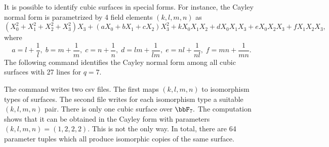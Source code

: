 \bigskip


It is possible to identify cubic surfaces in special forms. 
For instance, the Cayley normal form is parametrized by 4 field elements $(k,l,m,n)$ as
$$
\left(X_0^2+X_1^2+X_2^2+X_3^2\right)X_3 + \left(aX_0+bX_1+cX_2\right)X_3^2+kX_0X_1X_2+dX_0X_1X_3+eX_0X_2X_3+fX_1X_2X_3,
$$
where 
$$
a=l+ \frac{1}{l}, \;
b=m+ \frac{1}{m}, \;
c=n+ \frac{1}{n}, \;
d=lm+ \frac{1}{lm}, \;
e=nl+ \frac{1}{nl}, \;
f=mn+ \frac{1}{mn}.
$$
The following command identifies the Cayley normal form among all cubic surfaces with 27 lines for $q=7.$


The command writes two csv files. The first maps $(k,l,m,n)$ to isomorphism types of surfaces. 
The second file writes for each isomorphism type a suitable $(k,l,m,n)$ pair.
There is only one cubic surface over $\bbF_7.$
The computation shows that it can be obtained in the Cayley form with parameters $(k,l,m,n) = (1,2,2,2)$.
This is not the only way. 
In total, there are 64 parameter tuples which all produce isomorphic copies of the same surface.

\bigskip





